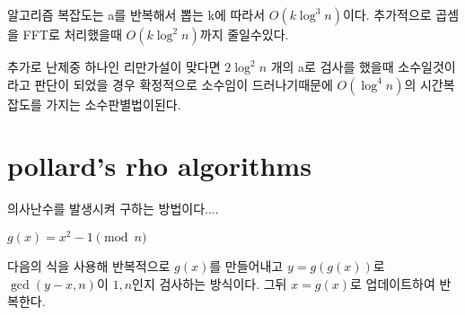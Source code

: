 알고리즘 복잡도는 a를 반복해서 뽑는 k에 따라서 $O(k \log^3 n)$이다. 추가적으로 곱셈을 FFT로 처리했을때 $O(k \log^2 n)$까지 줄일수있다.

추가로 난제중 하나인 리만가설이 맞다면 $2\log^2 n$ 개의 a로 검사를 했을때 소수일것이라고 판단이 되었을 경우 확정적으로 소수임이 드러나기때문에 $O(\log^4 n)$의 시간복잡도를 가지는 소수판별법이된다.

\section{pollard's rho algorithms}

의사난수를 발생시켜 구하는 방법이다....


$ g(x)  = x ^2-1 \pmod{n} $

다음의 식을 사용해 반복적으로 $g(x)$를 만들어내고 
$y = g(g(x))$로 $\gcd(y-x, n)$이 $1,n$인지 검사하는 방식이다. 그뒤 $x = g(x)$로 업데이트하여 반복한다.


